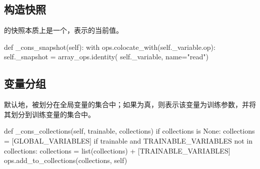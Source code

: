\begin{content}
\subsection{构造快照}

的快照本质上是一个，表示的当前值。

\begin{leftbar}
\begin{python}
  def _cons_snapshot(self):
    with ops.colocate_with(self._variable.op):
      self._snapshot = array_ops.identity(
        self._variable, name="read")
\end{python}
\end{leftbar}

\subsection{变量分组}

默认地，被划分在全局变量的集合中；如果为真，则表示该变量为训练参数，并将其划分到训练变量的集合中。

\begin{leftbar}
\begin{python}
  def _cons_collections(self, trainable, collections)
    if collections is None:
      collections = [GLOBAL_VARIABLES]
    if trainable and TRAINABLE_VARIABLES not in collections:
      collections = list(collections) + [TRAINABLE_VARIABLES]
    ops.add_to_collections(collections, self)
\end{python}
\end{leftbar}

\end{content}